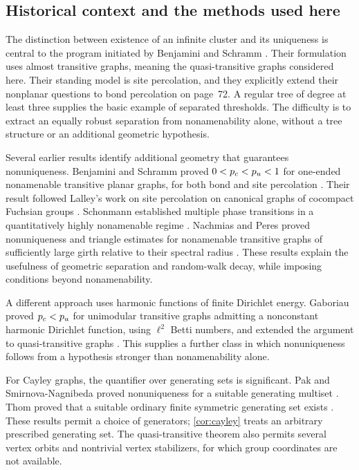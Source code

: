 \subsection{Historical context and the methods used here}

The distinction between existence of an infinite cluster and its
uniqueness is central to the program initiated by Benjamini and Schramm
\cite{BenjaminiSchramm1996}. Their formulation uses almost transitive
graphs, meaning the quasi-transitive graphs considered here.
Their standing model is site percolation, and they explicitly extend
their nonplanar questions to bond percolation on page~72. A regular
tree of degree at least three supplies the basic example of separated
thresholds. The difficulty is to extract an equally robust separation
from nonamenability alone, without a tree structure or an additional
geometric hypothesis.

Several earlier results identify additional geometry that guarantees
nonuniqueness. Benjamini and Schramm proved $0<{p_c}<{p_u}<1$ for
one-ended nonamenable transitive planar graphs, for both bond and site
percolation \cite[Theorem~1.1]{BenjaminiSchramm2001}. Their result
followed Lalley's work on site percolation on canonical graphs of
cocompact Fuchsian groups \cite{Lalley1998}. Schonmann established
multiple phase transitions in a quantitatively highly nonamenable
regime \cite{Schonmann2001}. Nachmias and Peres proved nonuniqueness
and triangle estimates for nonamenable transitive graphs of sufficiently large
girth relative to their spectral radius \cite{NachmiasPeres2012}.
These results explain the usefulness of geometric separation and
random-walk decay, while imposing conditions beyond nonamenability.

A different approach uses harmonic functions of finite Dirichlet energy.
Gaboriau proved ${p_c}<{p_u}$ for unimodular transitive graphs admitting a
nonconstant harmonic Dirichlet function, using $\ell^2$ Betti numbers,
and extended the argument to quasi-transitive graphs
\cite[Theorem~0.6 and Section~5]{Gaboriau2005}. This supplies a further
class in which nonuniqueness follows from a hypothesis stronger than
nonamenability alone.

For Cayley graphs, the quantifier over generating sets is significant.
Pak and Smirnova-Nagnibeda proved nonuniqueness for a suitable generating
multiset \cite{PakSmirnovaNagnibeda2000}. Thom proved that a suitable ordinary
finite symmetric generating set exists \cite[Corollary~8]{Thom2015}. These results
permit a choice of generators; \cref{cor:cayley} treats an arbitrary
prescribed generating set. The quasi-transitive theorem also permits
several vertex orbits and nontrivial vertex stabilizers, for which group
coordinates are not available.

